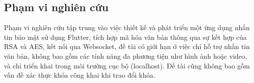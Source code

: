 \subsection{Phạm vi nghiên cứu}
\indent Phạm vi nghiên cứu tập trung vào việc thiết kế và phát triển một ứng dụng nhắn tin bảo mật sử dụng Flutter, tích hợp mã hóa văn bản thông qua sự kết hợp của RSA và AES, kết nối qua Websocket, đề tài có giới hạn ở việc chỉ hỗ trợ nhắn tin văn bản, không bao gồm các tính năng đa phương tiện như hình ảnh hoặc video, và chỉ triển khai trong môi trường cục bộ (localhost). Đề tài cũng không bao gồm vấn đề xác thực khóa công khai khi trao đổi khóa.

